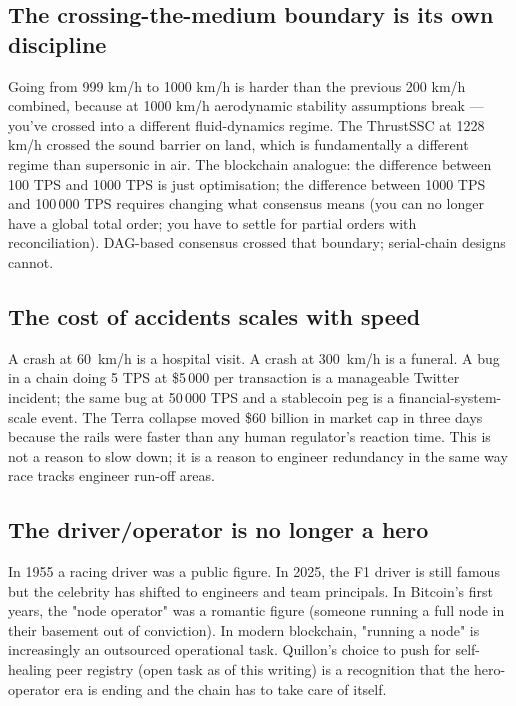 \documentclass[11pt,a4paper]{article}
\begin{document}
\subsection{The crossing-the-medium boundary is its own discipline}

Going from 999 km/h to 1000 km/h is harder than the previous 200 km/h
combined, because at 1000 km/h aerodynamic stability assumptions
break --- you've crossed into a different fluid-dynamics regime. The
ThrustSSC at 1228 km/h crossed the sound barrier on land, which is
fundamentally a different regime than supersonic in air. The
blockchain analogue: the difference between 100 TPS and 1000 TPS is
just optimisation; the difference between 1000 TPS and 100\,000 TPS
requires changing what consensus means (you can no longer have a global
total order; you have to settle for partial orders with reconciliation).
DAG-based consensus crossed that boundary; serial-chain designs cannot.

\subsection{The cost of accidents scales with speed}

A crash at 60~km/h is a hospital visit. A crash at 300~km/h is a
funeral. A bug in a chain doing 5 TPS at \$5\,000 per transaction is a
manageable Twitter incident; the same bug at 50\,000 TPS and a stablecoin
peg is a financial-system-scale event. The Terra collapse moved \$60
billion in market cap in three days because the rails were faster than
any human regulator's reaction time. This is not a reason to slow down;
it is a reason to engineer redundancy in the same way race tracks
engineer run-off areas.

\subsection{The driver/operator is no longer a hero}

In 1955 a racing driver was a public figure. In 2025, the F1 driver is
still famous but the celebrity has shifted to engineers and team
principals. In Bitcoin's first years, the "node operator" was a romantic
figure (someone running a full node in their basement out of conviction).
In modern blockchain, "running a node" is increasingly an outsourced
operational task. Quillon's choice to push for self-healing peer
registry (open task as of this writing) is a recognition that the
hero-operator era is ending and the chain has to take care of itself.
\end{document}
